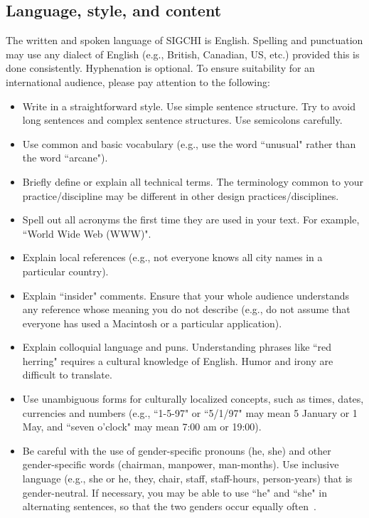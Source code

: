 \documentclass{chi-ext}
\begin{document}
\subsection{Language, style, and content}
The written and spoken language of SIGCHI is English. 
Spelling and punctuation may use any dialect of English (e.g., British, Canadian, US, etc.) provided this is done consistently. 
Hyphenation is optional. 
To ensure suitability for an international audience, please pay attention to the following:

\begin{itemize}\compresslist
\item 	
Write in a straightforward style. 
Use simple sentence structure. 
Try to avoid long sentences and complex sentence structures. 
Use semicolons carefully.
\item 	
Use common and basic vocabulary (e.g., use the word ``unusual" rather than the word ``arcane").
\item 	
Briefly define or explain all technical terms. 
The terminology common to your practice/discipline may be different in other design practices/disciplines.
\item 	
Spell out all acronyms the first time they are used in your text. 
For example, ``World Wide Web (WWW)".
\item 	
Explain local references (e.g., not everyone knows all city names in a particular country).
\item 	
Explain ``insider" comments. 
Ensure that your whole audience understands any reference whose meaning you do not describe (e.g., do not assume that everyone has used a Macintosh or a particular application).
\item 	
Explain colloquial language and puns. 
Understanding phrases like ``red herring" requires a cultural knowledge of English. 
Humor and irony are difficult to translate.
\item 	
Use unambiguous forms for culturally localized concepts, such as times, dates, currencies and numbers (e.g., ``1-5-97" or ``5/1/97" may mean 5 January or 1 May, and ``seven o'clock" may mean 7:00 am or 19:00).
\item 	
Be careful with the use of gender-specific pronouns (he, she) and other gender-specific words (chairman, manpower, man-months). 
Use inclusive language (e.g., she or he, they, chair, staff, staff-hours, person-years) that is gender-neutral. 
If necessary, you may be able to use ``he" and ``she" in alternating sentences, so that the two genders occur equally often~\cite{Schwartz95}. 
\end{itemize}
\end{document}
